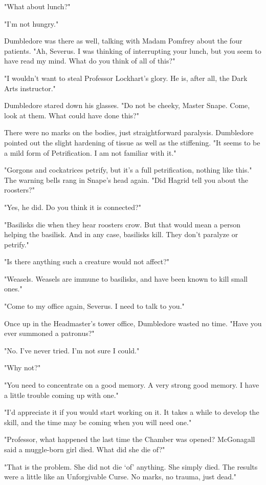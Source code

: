 \documentclass[a4paper,11pt]{article}
\begin{document}
"What about lunch?"

"I'm not hungry."

Dumbledore was there as well, talking with Madam Pomfrey about the four patients. "Ah, Severus. I was thinking of interrupting your lunch, but you seem to have read my mind. What do you think of all of this?"

"I wouldn't want to steal Professor Lockhart's glory. He is, after all, the Dark Arts instructor."

Dumbledore stared down his glasses. "Do not be cheeky, Master Snape. Come, look at them. What could have done this?"

There were no marks on the bodies, just straightforward paralysis. Dumbledore pointed out the slight hardening of tissue as well as the stiffening. "It seems to be a mild form of Petrification. I am not familiar with it."

"Gorgons and cockatrices petrify, but it's a full petrification, nothing like this." The warning bells rang in Snape's head again. "Did Hagrid tell you about the roosters?"

"Yes, he did. Do you think it is connected?"

"Basilisks die when they hear roosters crow. But that would mean a person helping the basilisk. And in any case, basilisks kill. They don't paralyze or petrify."

"Is there anything such a creature would not affect?"

"Weasels. Weasels are immune to basilisks, and have been known to kill small ones."

"Come to my office again, Severus. I need to talk to you."

Once up in the Headmaster's tower office, Dumbledore wasted no time. "Have you ever summoned a patronus?"

"No. I've never tried. I'm not sure I could."

"Why not?"

"You need to concentrate on a good memory. A very strong good memory. I have a little trouble coming up with one."

"I'd appreciate it if you would start working on it. It takes a while to develop the skill, and the time may be coming when you will need one."

"Professor, what happened the last time the Chamber was opened? McGonagall said a muggle-born girl died. What did she die of?"

"That is the problem. She did not die `of' anything. She simply died. The results were a little like an Unforgivable Curse. No marks, no trauma, just dead."
\end{document}
